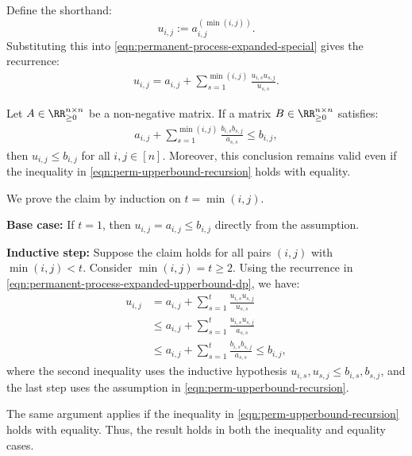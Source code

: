 \documentclass[11pt]{article}
\makeatletter
\theoremstyle{definition}
\newenvironment{proof}[1][\protect\proofname]{\par
	\normalfont\topsep6\p@\@plus6\p@\relax
	\trivlist
	\itemindent\parindent        %
	\item[\hskip\labelsep\scshape #1]\ignorespaces
}{%
	\endtrivlist\@endpefalse
}
\providecommand{\proofname}{Proof}
\makeatother
\begin{document}
Define the shorthand:
\begin{equation*}
    u_{i,j} := a_{i,j}^{(\min(i,j))}.
\end{equation*}
Substituting this into \eqref{eqn:permanent-process-expanded-special} gives the recurrence:
\begin{align}
	\label{eqn:permanent-process-expanded-upperbound-dp}
	u_{i,j} = a_{i,j} + \sum_{s=1}^{\min(i,j)} \frac{u_{i,s} u_{s,j}}{u_{s,s}}.
\end{align}

\begin{theorem}
	\label{thm:perm-upperbound-recursion}
	Let \( A \in \RR^{n \times n}_{\geq 0} \) be a non-negative matrix. If a matrix \( B \in \RR^{n \times n}_{\geq 0} \) satisfies:
	\begin{align}
		\label{eqn:perm-upperbound-recursion}
		a_{i,j} + \sum_{s=1}^{\min(i,j)} \frac{b_{i,s} b_{s,j}}{a_{s,s}} \le b_{i,j},
	\end{align}
	then \( u_{i,j} \le b_{i,j} \) for all \( i,j \in [n] \). Moreover, this conclusion remains valid even if the inequality in \eqref{eqn:perm-upperbound-recursion} holds with equality.
\end{theorem}

\begin{proof}
	We prove the claim by induction on \( t = \min(i,j) \).
	
	\textbf{Base case:} If \( t = 1 \), then \( u_{i,j} = a_{i,j} \le b_{i,j} \) directly from the assumption.
	
	\textbf{Inductive step:} Suppose the claim holds for all pairs \( (i,j) \) with \( \min(i,j) < t \). Consider \( \min(i,j) = t \ge 2 \). Using the recurrence in \eqref{eqn:permanent-process-expanded-upperbound-dp}, we have:
	\begin{align*}
		u_{i,j} &= a_{i,j} + \sum_{s=1}^t \frac{u_{i,s} u_{s,j}}{u_{s,s}} \\
		&\le a_{i,j} + \sum_{s=1}^t \frac{u_{i,s} u_{s,j}}{a_{s,s}} \\
		&\le a_{i,j} + \sum_{s=1}^t \frac{b_{i,s} b_{s,j}}{a_{s,s}} \le b_{i,j},
	\end{align*}
	where the second inequality uses the inductive hypothesis \( u_{i,s}, u_{s,j} \le b_{i,s}, b_{s,j} \), and the last step uses the assumption in \eqref{eqn:perm-upperbound-recursion}.
	
	The same argument applies if the inequality in \eqref{eqn:perm-upperbound-recursion} holds with equality. Thus, the result holds in both the inequality and equality cases.
\end{proof}
\end{document}
